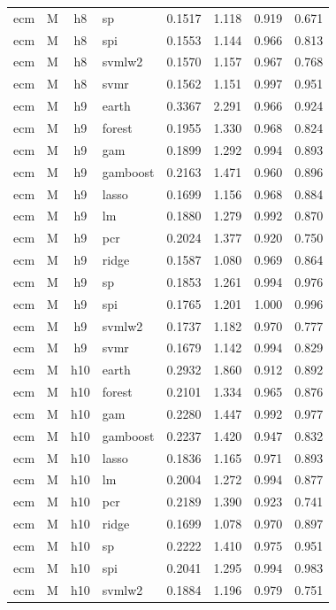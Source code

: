 \begin{ThreePartTable}
\begin{longtable}[t]{llclcccc}
ecm & M & h8 & sp & 0.1517 & 1.118 & 0.919 & 0.671\\
ecm & M & h8 & spi & 0.1553 & 1.144 & 0.966 & 0.813\\
ecm & M & h8 & svmlw2 & 0.1570 & 1.157 & 0.967 & 0.768\\
ecm & M & h8 & svmr & 0.1562 & 1.151 & 0.997 & 0.951\\
\addlinespace
ecm & M & h9 & earth & 0.3367 & 2.291 & 0.966 & 0.924\\
ecm & M & h9 & forest & 0.1955 & 1.330 & 0.968 & 0.824\\
ecm & M & h9 & gam & 0.1899 & 1.292 & 0.994 & 0.893\\
ecm & M & h9 & gamboost & 0.2163 & 1.471 & 0.960 & 0.896\\
ecm & M & h9 & lasso & 0.1699 & 1.156 & 0.968 & 0.884\\
ecm & M & h9 & lm & 0.1880 & 1.279 & 0.992 & 0.870\\
ecm & M & h9 & pcr & 0.2024 & 1.377 & 0.920 & 0.750\\
ecm & M & h9 & ridge & 0.1587 & 1.080 & 0.969 & 0.864\\
ecm & M & h9 & sp & 0.1853 & 1.261 & 0.994 & 0.976\\
ecm & M & h9 & spi & 0.1765 & 1.201 & 1.000 & 0.996\\
ecm & M & h9 & svmlw2 & 0.1737 & 1.182 & 0.970 & 0.777\\
ecm & M & h9 & svmr & 0.1679 & 1.142 & 0.994 & 0.829\\
\addlinespace
ecm & M & h10 & earth & 0.2932 & 1.860 & 0.912 & 0.892\\
ecm & M & h10 & forest & 0.2101 & 1.334 & 0.965 & 0.876\\
ecm & M & h10 & gam & 0.2280 & 1.447 & 0.992 & 0.977\\
ecm & M & h10 & gamboost & 0.2237 & 1.420 & 0.947 & 0.832\\
ecm & M & h10 & lasso & 0.1836 & 1.165 & 0.971 & 0.893\\
ecm & M & h10 & lm & 0.2004 & 1.272 & 0.994 & 0.877\\
ecm & M & h10 & pcr & 0.2189 & 1.390 & 0.923 & 0.741\\
ecm & M & h10 & ridge & 0.1699 & 1.078 & 0.970 & 0.897\\
ecm & M & h10 & sp & 0.2222 & 1.410 & 0.975 & 0.951\\
ecm & M & h10 & spi & 0.2041 & 1.295 & 0.994 & 0.983\\
ecm & M & h10 & svmlw2 & 0.1884 & 1.196 & 0.979 & 0.751\\

\end{longtable}
\end{ThreePartTable}
